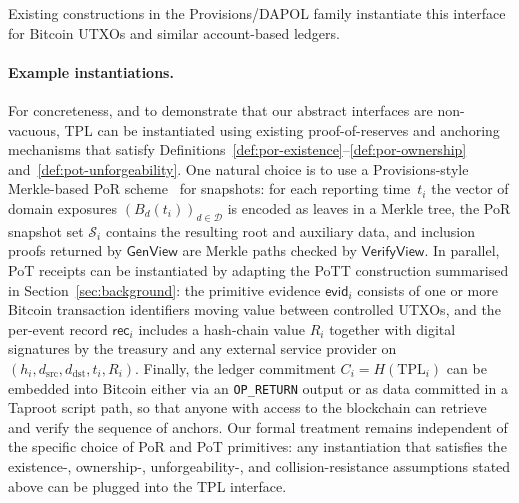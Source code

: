 \documentclass[11pt]{article}
\begin{document}
Existing constructions in the Provisions/DAPOL family instantiate this interface for Bitcoin UTXOs and similar account-based ledgers.

\paragraph{Example instantiations.}
For concreteness, and to demonstrate that our abstract interfaces are non-vacuous, TPL can be instantiated
using existing proof-of-reserves and anchoring mechanisms that satisfy Definitions~\ref{def:por-existence}--\ref{def:por-ownership}
and~\ref{def:pot-unforgeability}.
One natural choice is to use a Provisions-style Merkle-based PoR scheme~\cite{Dagher2015} for snapshots: for each reporting time~$t_i$ the vector of domain exposures $(B_d(t_i))_{d\in\mathcal{D}}$ is encoded as leaves in a Merkle tree, the PoR snapshot set $\mathcal{S}_i$ contains the resulting root and auxiliary data, and inclusion proofs returned by $\mathsf{GenView}$ are Merkle paths checked by $\mathsf{VerifyView}$.
In parallel, PoT receipts can be instantiated by adapting the PoTT construction summarised in Section~\ref{sec:background}: the primitive evidence $\mathsf{evid}_i$ consists of one or more Bitcoin transaction identifiers moving value between controlled UTXOs, and the per-event record $\mathsf{rec}_i$ includes a hash-chain value $R_i$ together with digital signatures by the treasury and any external service provider on $(h_i,d_{\mathrm{src}},d_{\mathrm{dst}},t_i,R_i)$.
Finally, the ledger commitment $C_i = H(\mathrm{TPL}_i)$ can be embedded into Bitcoin either via an \texttt{OP\_RETURN} output or as data committed in a Taproot script path, so that anyone with access to the blockchain can retrieve and verify the sequence of anchors.
Our formal treatment remains independent of the specific choice of PoR and PoT primitives: any instantiation that satisfies the existence-, ownership-, unforgeability-, and collision-resistance assumptions stated above can be plugged into the TPL interface.
\end{document}
